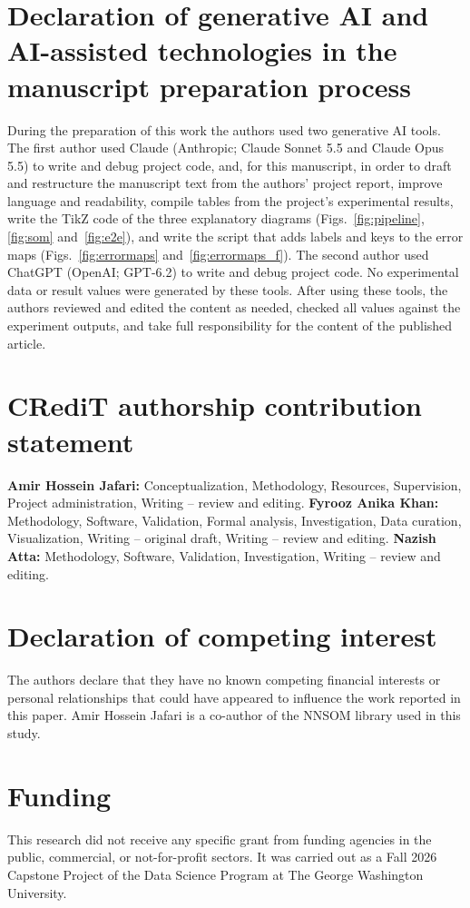 \documentclass[preprint,review,12pt]{elsarticle}
\begin{document}
\section*{Declaration of generative AI and AI-assisted technologies in the manuscript preparation process}
During the preparation of this work the authors used two generative AI tools. The first author used Claude (Anthropic; Claude Sonnet 5.5 and Claude Opus 5.5) to write and debug project code, and, for this manuscript, in order to draft and restructure the manuscript text from the authors' project report, improve language and readability, compile tables from the project's experimental results, write the TikZ code of the three explanatory diagrams (Figs.~\ref{fig:pipeline}, \ref{fig:som} and~\ref{fig:e2e}), and write the script that adds labels and keys to the error maps (Figs.~\ref{fig:errormaps} and~\ref{fig:errormaps_f}). The second author used ChatGPT (OpenAI; GPT-6.2) to write and debug project code. No experimental data or result values were generated by these tools. After using these tools, the authors reviewed and edited the content as needed, checked all values against the experiment outputs, and take full responsibility for the content of the published article.

\section*{CRediT authorship contribution statement}
\textbf{Amir Hossein Jafari:} Conceptualization, Methodology, Resources, Supervision, Project administration, Writing -- review and editing. \textbf{Fyrooz Anika Khan:} Methodology, Software, Validation, Formal analysis, Investigation, Data curation, Visualization, Writing -- original draft, Writing -- review and editing. \textbf{Nazish Atta:} Methodology, Software, Validation, Investigation, Writing -- review and editing.

\section*{Declaration of competing interest}
The authors declare that they have no known competing financial interests or personal relationships that could have appeared to influence the work reported in this paper. Amir Hossein Jafari is a co-author of the NNSOM library used in this study.

\section*{Funding}
This research did not receive any specific grant from funding agencies in the public, commercial, or not-for-profit sectors. It was carried out as a Fall 2026 Capstone Project of the Data Science Program at The George Washington University.
\end{document}
